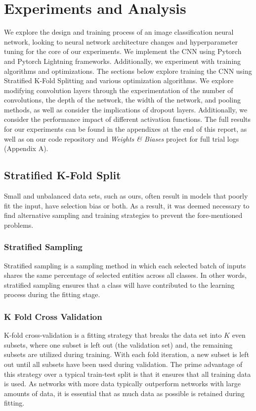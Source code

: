 \documentclass{article}
\begin{document}
\section{Experiments and Analysis}
 We explore the design and training process of an image classification neural network, looking to neural network architecture changes and hyperparameter tuning for the core of our experiments. We implement the CNN using Pytorch \cite{NEURIPS2019_9015} and Pytorch Lightning \cite{pytorch-lightning} frameworks. Additionally, we experiment with training algorithms and optimizations. The sections below explore training the CNN using Stratified K-Fold Splitting and various optimization algorithms. We explore modifying convolution layers through the experimentation of the number of convolutions, the depth of the network, the width of the network, and pooling methods, as well as consider the implications of dropout layers. Additionally, we consider the performance impact of different activation functions. The full results for our experiments can be found in the appendixes at the end of this report, as well as on our code repository and \emph{Weights \& Biases} \cite{wandb} project for full trial logs (Appendix A). 

\subsection{Stratified K-Fold Split}
Small and unbalanced data sets, such as ours, often result in models that poorly fit the input, have selection bias or both. As a result, it was deemed necessary to find alternative sampling and training strategies to prevent the fore-mentioned problems.

\subsubsection{Stratified Sampling}
Stratified sampling is a sampling method in which each selected batch of inputs shares the same percentage of selected entities across all classes. In other words, stratified sampling ensures that a class will have contributed to the learning process during the fitting stage.

\subsubsection{K Fold Cross Validation}
K-fold cross-validation is a fitting strategy that breaks the data set into $K$ even subsets, where one subset is left out (the validation set) and, the remaining subsets are utilized during training. With each fold iteration, a new subset is left out until all subsets have been used during validation. The prime advantage of this strategy over a typical train-test split is that it ensures that all training data is used. As networks with more data typically outperform networks with large amounts of data, it is essential that as much data as possible is retained during fitting.
\end{document}
